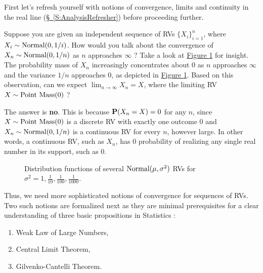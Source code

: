 First let's refresh yourself with notions of convergence, limits and continuity in the real line (\hyperref[S:AnalysisRefresher]{\S~\ref*{S:AnalysisRefresher}}) before proceeding further.


\begin{classwork}\label{CW:Normal01bynConvToPointMass0}
Suppose you are given an independent sequence of RVs $\{X_i \}_{i=1}^n$, where $X_i \sim \mbox{{\rm Normal}}(0,1/i)$.  How would you talk about the convergence of $X_n \sim \mbox{{\rm Normal}}(0,1/n)$ as $n$ approaches $\infty$ ?  Take a look at \hyperref[F:PlotNormal01bynConvToPointMass0]{Figure \ref*{F:PlotNormal01bynConvToPointMass0}} for insight.  The probability mass of $X_n$ increasingly concentrates about $0$ as $n$ approaches $\infty$ and the variance $1/n$ approaches $0$, as depicted in \hyperref[F:PlotNormal01bynConvToPointMass0]{Figure \ref*{F:PlotNormal01bynConvToPointMass0}}.  Based on this observation, can we expect $\lim_{n \rightarrow \infty} X_n = X$, where the limiting RV $X \sim \mbox{{\rm Point~Mass}}(0)$ ?

The answer is {\bf no}.  This is because $\mathbf{P}(X_n=X)=0$ for any $n$, since $X \sim \mbox{{\rm Point~Mass}}(0)$ is a discrete RV with exactly one outcome $0$ and $X_n \sim \mbox{{\rm Normal}}(0,1/n)$ is a continuous RV for every $n$, however large.  In other words, a continuous RV, such as $X_n$, has $0$ probability of realizing any single real number in its support, such as $0$.    
\begin{figure}[htpb]
\caption{Distribution functions of several $\mbox{{\rm Normal}}(\mu,\sigma^2)$ RVs for $\sigma^2 = 1,\frac{1}{10},\frac{1}{100},\frac{1}{1000}$.\label{F:PlotNormal01bynConvToPointMass0}}
\centering   {}
\end{figure}
\end{classwork}

Thus, we need more sophisticated notions of convergence for sequences of RVs.  Two such notions are formalized next as they are minimal prerequisites for a clear understanding of three basic propositions in Statistics :
\begin{enumerate} 
\item Weak Law of Large Numbers,
\item Central Limit Theorem,
\item Gilvenko-Cantelli Theorem.
\end{enumerate}


